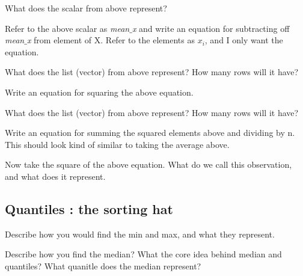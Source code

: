 \documentclass[11pt]{article}
\begin{document}
 What does the scalar from above represent? 
\newline 
\newline
\newline 


Refer to the above scalar as \emph{mean$\_$x} and write an equation for subtracting off \emph{mean$\_$x} from element of X. Refer to the elements as $x_i$, and I only want the equation. 
\newline 
\newline
\newline 


What does the list (vector) from above represent? How many rows will it have?
\newline 
\newline
\newline 

Write an equation for squaring the above equation.
\newline 
\newline
\newline 


What does the list (vector) from above represent? How many rows will it have?
\newline 
\newline
\newline 


Write an equation for summing the squared elements above and dividing by n. This should look kind of similar to taking the average above.
\newline 
\newline
\newline 


Now take the square of the above equation. What do we call this observation, and what does it represent.
\newline 
\newline
\newline 



\subsection{  Quantiles : the sorting hat}

Describe how you would find the min and max, and what they represent. 
\newline 
\newline
\newline 

Describe how you find the median? What the core idea behind median and quantiles? What quanitle does the median represent? 
\newline 
\newline
\newline 
\end{document}
